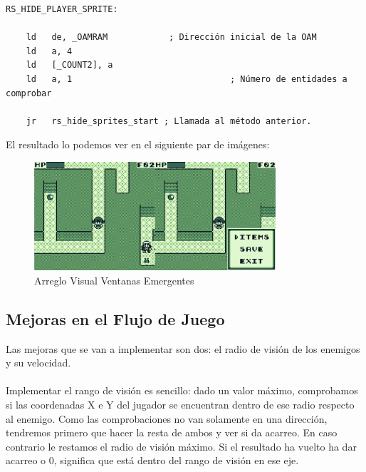 \begin{lstlisting}[caption={Escondido de Sprites Según su Tile}, label={code:hidesprite}]
RS_HIDE_PLAYER_SPRITE:
	
	ld 	 de, _OAMRAM 			; Dirección inicial de la OAM
	ld   a, 4
	ld 	 [_COUNT2], a
	ld 	 a, 1 								; Número de entidades a comprobar

	jr 	 rs_hide_sprites_start ; Llamada al método anterior.
\end{lstlisting}

El resultado lo podemos ver en el siguiente par de imágenes:

\begin{figure}[h]
\centering
\includegraphics[width=0.8\textwidth]{include/images/desarrollo/fixedhud.png}
\caption{Arreglo Visual Ventanas Emergentes}
\label{figure:hudfix}
\end{figure}

\subsection{Mejoras en el Flujo de Juego}

Las mejoras que se van a implementar son dos: el radio de visión de los enemigos y su velocidad.
\\ \\
Implementar el rango de visión es sencillo: dado un valor máximo, comprobamos si las coordenadas X e Y del jugador se encuentran dentro de ese radio respecto al enemigo. Como las comprobaciones no van solamente en una dirección, tendremos primero que hacer la resta de ambos y ver si da acarreo. En caso contrario le restamos el radio de visión máximo. Si el resultado ha vuelto ha dar acarreo o 0, significa que está dentro del rango de visión en ese eje.

